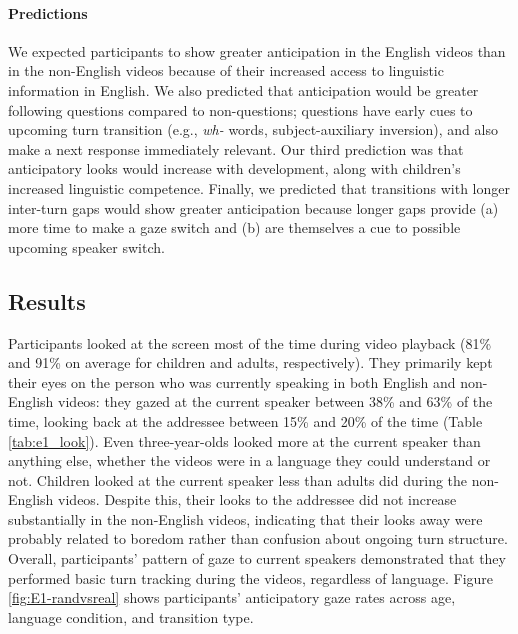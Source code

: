 \documentclass[authoryear, 12pt]{elsarticle}
\begin{document}
\paragraph{Predictions}
We expected participants to show greater anticipation in the English videos than in the non-English videos because of their increased access to linguistic information in English. We also predicted that anticipation would be greater following questions compared to non-questions; questions have early cues to upcoming turn transition (e.g., \textit{wh-} words, subject-auxiliary inversion), and also make a next response immediately relevant. Our third prediction was that anticipatory looks would increase with development, along with children's increased linguistic competence. Finally, we predicted that transitions with longer inter-turn gaps would show greater anticipation because longer gaps provide (a) more time to make a gaze switch and (b) are themselves a cue to possible upcoming speaker switch.

\subsection*{Results}
\label{sec:results1}

Participants looked at the screen most of the time during video playback (81\% and 91\% on average for children and adults, respectively). They primarily kept their eyes on the person who was currently speaking in both English and non-English videos: they gazed at the current speaker between 38\% and 63\% of the time, looking back at the addressee between 15\% and 20\% of the time (Table \ref{tab:e1_look}). Even three-year-olds looked more at the current speaker than anything else, whether the videos were in a language they could understand or not. Children looked at the current speaker less than adults did during the non-English videos. Despite this, their looks to the addressee did not increase substantially in the non-English videos, indicating that their looks away were probably related to boredom rather than confusion about ongoing turn structure. Overall, participants' pattern of gaze to current speakers demonstrated that they performed basic turn tracking during the videos, regardless of language. Figure \ref{fig:E1-randvsreal} shows participants' anticipatory gaze rates across age, language condition, and transition type.
\end{document}
